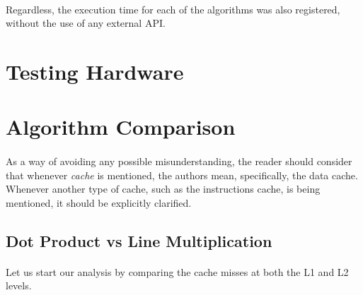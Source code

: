 \documentclass{report}
\begin{document}
			\paragraph{}Regardless, the execution time for each of the algorithms was also registered, without the use of any external API.
			
		\section{Testing Hardware}
			
		\section{Algorithm Comparison}
		
			\paragraph{}As a way of avoiding any possible misunderstanding, the reader should consider that whenever \emph{cache} is mentioned, the authors mean, specifically, the data cache. Whenever another type of cache, such as the instructions cache, is being mentioned, it should be explicitly clarified.
		
			\subsection{Dot Product vs Line Multiplication}
			
				\paragraph{}Let us start our analysis by comparing the cache misses at both the L1 and L2 levels.
			
\end{document}
